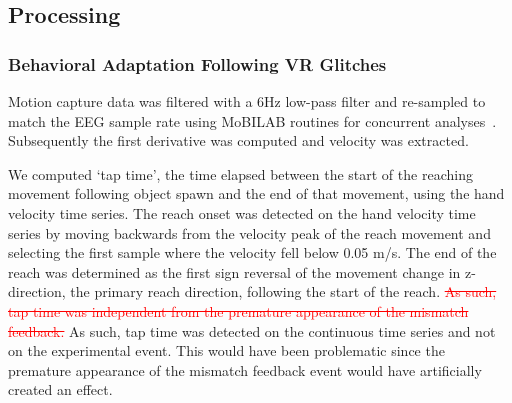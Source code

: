 \subsection{Processing}

\subsubsection{Behavioral Adaptation Following VR Glitches}

Motion capture data was filtered with a 6Hz low-pass filter and re-sampled to match the EEG sample rate using MoBILAB routines for concurrent analyses~\cite{Ojeda2014-ev}. Subsequently the first derivative was computed and velocity was extracted. 

We computed `tap time', the time elapsed between the start of the reaching movement following object spawn and the end of that movement, using the hand velocity time series. The reach onset was detected on the hand velocity time series by moving backwards from the velocity peak of the reach movement and selecting the first sample where the velocity fell below 0.05 m/s. The end of the reach was determined as the first sign reversal of the movement change in z-direction, the primary reach direction, following the start of the reach. \textcolor{red}{\st{As such, tap time was independent from the premature appearance of the mismatch feedback.}}
\textcolor{n}{As such, tap time was detected on the continuous time series and not on the experimental event. This would have been problematic since the premature appearance of the mismatch feedback event would have artificially created an effect.}

